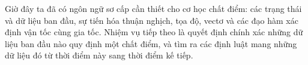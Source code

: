 Giờ đây ta đã có ngôn ngữ sơ cấp cần thiết cho cơ học chất điểm: các trạng thái và dữ liệu ban đầu, sự tiến hóa thuận nghịch, tọa độ, vectơ và các đạo hàm xác định vận tốc cùng gia tốc. Nhiệm vụ tiếp theo là quyết định chính xác những dữ liệu ban đầu nào quy định một chất điểm, và tìm ra các định luật mang những dữ liệu đó từ thời điểm này sang thời điểm kế tiếp.